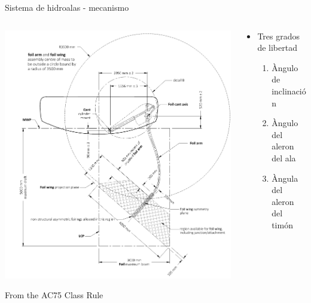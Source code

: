 \documentclass[presentation,aspectratio=169]{beamer}
\begin{document}
\begin{frame}[label={sec:orgaf721a5}]{Sistema de hidroalas - mecanismo}
\begin{columns}
\begin{column}{0.5\columnwidth}
\begin{center}
\includegraphics[height=0.8\textheight]{../../figures/AC75-class-foil.png}
\end{center}

{\footnotesize From the AC75 Class Rule}
\end{column}
\begin{column}{0.5\columnwidth}
\begin{itemize}
\item Tres grados de libertad
\begin{enumerate}
\item Àngulo de inclinación
\item Àngulo del aleron del ala
\item Àngula del aleron del timón
\end{enumerate}
\end{itemize}
\end{column}
\end{columns}
\end{frame}
\end{document}
